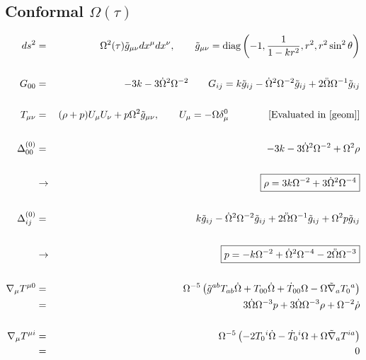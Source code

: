 \documentclass[10pt,letterpaper]{article}
\numberwithin{equation}{section}
\begin{document}
\subsection{Conformal $\Omega(\tau)$}
\begin{eqnarray}
ds^2 &=& \Omega^2(\tau)\tilde g_{\mu\nu} dx^\mu dx^\nu,\qquad 
\tilde g_{\mu\nu} = \text{diag}\left(-1,\frac{1}{1-kr^2},r^2,r^2\sin^2\theta\right)
\label{geom}
\\ \nonumber\\
G_{00}&=& -3k - 3 \dot\Omega^2\Omega^{-2}
\qquad
G_{ij} = k\tilde g_{ij} - \dot\Omega^2\Omega^{-2}\tilde g_{ij} + 2\ddot\Omega \Omega^{-1} \tilde g_{ij}
\\ \nonumber\\
T_{\mu\nu} &=& (\rho+p)U_\mu U_\nu + p\Omega^2 \tilde g_{\mu\nu},\qquad U_\mu = - \Omega \delta^0_\mu  \qquad\qquad  \text{[Evaluated in \eqref{geom}]}
\\ \nonumber\\
\Delta^{(0)}_{00} &=& -3k - 3 \dot\Omega^2\Omega^{-2} + \Omega^2 \rho
\\ \nonumber\\
&\to&\boxed{\rho = 3k\Omega^{-2}+3\dot\Omega^2 \Omega^{-4}}
\label{rho}
\\ \nonumber\\
\Delta^{(0)}_{ij} &=& k\tilde g_{ij} - \dot\Omega^2\Omega^{-2}\tilde g_{ij} + 2\ddot\Omega \Omega^{-1} \tilde g_{ij} + \Omega^2 p
\tilde g_{ij}
\\ \nonumber\\
&\to& \boxed{p = -k\Omega^{-2} + \dot\Omega^2\Omega^{-4} -2\ddot\Omega \Omega^{-3}}
\label{p}
\\ \nonumber\\
\nabla_\mu T^{\mu 0} &=& \Omega^{-5}\left( \tilde g^{ab} T_{ab} \dot{\Omega} + T_{00}{} \dot{\Omega} + \dot{T}_{00}{} \Omega -  \Omega \tilde{\nabla}_{a}T_{0}{}^{a}\right) 
\nonumber\\
&=& 3 \dot{\Omega}  \Omega^{-3}p + 3 \dot{\Omega}  \Omega^{-3}\rho +  \Omega^{-2}\dot{\rho}
\label{Tcons0}
\\ \nonumber\\
\nabla_\mu T^{\mu i} &=& \Omega^{-5}\left(-2 T_{0}{}^{i} \dot{\Omega} -  \dot{T}_{0}{}^{i} \Omega + \Omega \tilde{\nabla}_{a}T^{ia}\right)
\nonumber\\
&=&0
\end{eqnarray}
%
%
\end{document}
